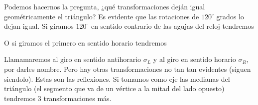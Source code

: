\documentclass[12pt]{article}
\begin{document}
\begin{center}
\end{center} 
Podemos hacernos la pregunta, ¿qué transformaciones deján igual geométricamente el triángulo? Es evidente que las rotaciones de $120^\circ$ grados lo dejan igual. Si giramos $120^\circ$ en sentido contrario de las agujas del reloj tendremos 
\begin{center}
\end{center} 
O si giramos el primero en sentido horario tendremos 
\begin{center}
\end{center} 
Llamamaremos al giro en sentido antihorario $\sigma_L$ y al giro en sentido horario $\sigma_R$, por darles nombre. Pero hay otras transformaciones no tan tan evidentes (siguen siendolo). Estas son las reflexiones. Si tomamos como eje las medianas del triángulo (el segmento que va de un vértice a la mitad del lado opuesto) tendremos $3$ transformaciones más. 
\begin{center}
\end{center} 
\end{document}

